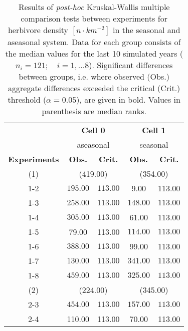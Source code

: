 \begin{table}[ht]
\centering
\small
\caption[Kruskal-Wallis multiple comparison of herbivore density.]{Results of \textit{post-hoc} Kruskal-Wallis multiple comparison
                            tests between experiments for herbivore density $[n\cdot km^{-2}]$ in the seasonal and aseasonal system.
                            Data for each group consists of the median values for the last 10 simulated years ($n_{i} = 121;\quad i = 1,\ldots8$).
                            Significant differences between groups, i.e. where observed (Obs.) aggregate differences exceeded the critical (Crit.) threshold ($\alpha = 0.05$), are given in bold. Values in parenthesis are median ranks.} 
\label{tab:chap:res:dyn:herbIND}
\begin{tabular*}{\textwidth}{@{\extracolsep{\fill} }ccccc}
  \toprule
& \multicolumn{2}{c}{\textbf{Cell 0}} & \multicolumn{2}{c}{\textbf{Cell 1}} \\
& \multicolumn{2}{c}{aseasonal} & \multicolumn{2}{c}{seasonal} \\
\cmidrule(lr){2-3} \cmidrule(lr){4-5}
\textbf{Experiments} & \textbf{Obs.} & \textbf{Crit.} & \textbf{Obs.} & \textbf{Crit.} \\
  \midrule
  (1) & \multicolumn{2}{c}{(419.00)} & \multicolumn{2}{c}{(354.00)} \\
1-2 & \(\mathbf{195.00}\) & \(\mathbf{113.00}\) & 9.00 & 113.00 \\ 
  1-3 & \(\mathbf{258.00}\) & \(\mathbf{113.00}\) & \(\mathbf{148.00}\) & \(\mathbf{113.00}\) \\ 
  1-4 & \(\mathbf{305.00}\) & \(\mathbf{113.00}\) & 61.00 & 113.00 \\ 
  1-5 & 79.00 & 113.00 & \(\mathbf{114.00}\) & \(\mathbf{113.00}\) \\ 
  1-6 & \(\mathbf{388.00}\) & \(\mathbf{113.00}\) & 99.00 & 113.00 \\ 
  1-7 & \(\mathbf{130.00}\) & \(\mathbf{113.00}\) & \(\mathbf{341.00}\) & \(\mathbf{113.00}\) \\ 
  1-8 & \(\mathbf{459.00}\) & \(\mathbf{113.00}\) & \(\mathbf{325.00}\) & \(\mathbf{113.00}\) \\ 
   [1ex]
(2) & \multicolumn{2}{c}{(224.00)} & \multicolumn{2}{c}{(345.00)} \\   
   2-3 & \(\mathbf{454.00}\) & \(\mathbf{113.00}\) & \(\mathbf{157.00}\) & \(\mathbf{113.00}\) \\ 
  2-4 & 110.00 & 113.00 & 70.00 & 113.00 \\ 

\end{tabular*}
\end{table}
